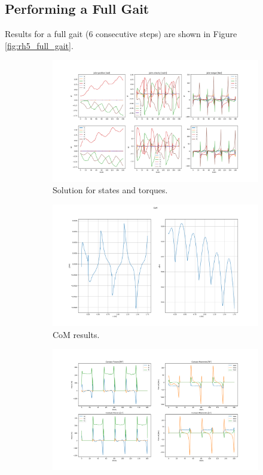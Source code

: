 \subsection{Performing a Full Gait}
Results for a full gait (6 consecutive steps) are shown in Figure \ref{fig:rh5_full_gait}.
\begin{figure}[h!]
\centering
\begin{subfigure}{.7\textwidth}
  \centering
  \includegraphics[width=1\linewidth]{Media/Crocoddyl/RH5Legs/RH5Gait_Solution.png}
  \caption{Solution for states and torques.}
\end{subfigure}
\begin{subfigure}{.7\textwidth}
  \centering
\includegraphics[width=1\linewidth]{Media/Crocoddyl/RH5Legs/RH5Gait_CoM2.png}
\caption{CoM results.}
\end{subfigure}
\begin{subfigure}{.7\textwidth}
  \centering
\includegraphics[width=1\linewidth]{Media/Crocoddyl/RH5Legs/RH5Gait_ContactWrenches.png}

\end{subfigure}
\end{figure}

